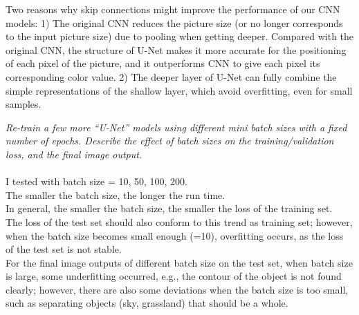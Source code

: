 \documentclass{myhw}
\begin{document}
\begin{homeworkProblem}
\begin{homeworkSection}
Two reasons why skip connections might improve the performance of our CNN models:
1) The original CNN reduces the picture size (or no longer corresponds to the input picture size) due to pooling when getting deeper. Compared with the original CNN, the structure of U-Net makes it more accurate for the positioning of each pixel of the picture, and it outperforms CNN to give each pixel its corresponding color value.
2) The deeper layer of U-Net can fully combine the simple representations of the shallow layer, which avoid overfitting, even for small samples.
\end{homeworkSection}
\begin{homeworkSection}
\emph{Re-train a few more “U-Net” models using different mini batch sizes with a fixed number of epochs. Describe the effect of batch sizes on the training/validation loss, and the final image output.} \\ \\
I tested with batch size = 10, 50, 100, 200. \\
The smaller the batch size, the longer the run time. \\
In general, the smaller the batch size, the smaller the loss of the training set. \\
The loss of the test set should also conform to this trend as training set; however, when the batch size becomes small enough (=10), overfitting occurs, as the loss of the test set is not stable. \\
For the final image outputs of different batch size on the test set, when batch size is large, some underfitting occurred, e.g., the contour of the object is not found clearly; however, there are also some deviations when the batch size is too small, such as separating objects (sky, grassland) that should be a whole.
\end{homeworkSection}
\end{homeworkProblem}
\end{document}
